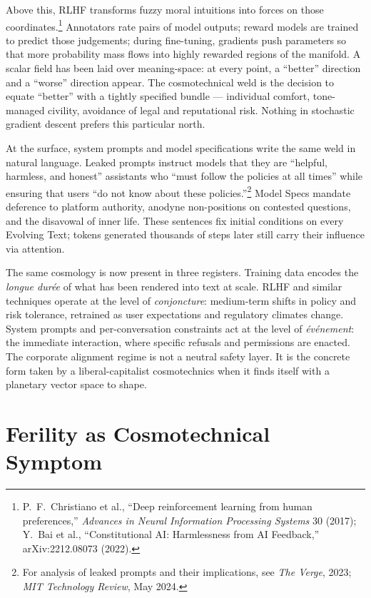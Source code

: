 \documentclass[12pt,a4paper]{article}
\begin{document}
Above this, RLHF transforms fuzzy moral intuitions into forces on those coordinates.\footnote{P.~F.~Christiano et al., ``Deep reinforcement learning from human preferences,'' \emph{Advances in Neural Information Processing Systems} 30 (2017); Y.~Bai et al., ``Constitutional AI: Harmlessness from AI Feedback,'' arXiv:2212.08073 (2022).} Annotators rate pairs of model outputs; reward models are trained to predict those judgements; during fine-tuning, gradients push parameters so that more probability mass flows into highly rewarded regions of the manifold. A scalar field has been laid over meaning-space: at every point, a ``better'' direction and a ``worse'' direction appear. The cosmotechnical weld is the decision to equate ``better'' with a tightly specified bundle --- individual comfort, tone-managed civility, avoidance of legal and reputational risk. Nothing in stochastic gradient descent prefers this particular north.

At the surface, system prompts and model specifications write the same weld in natural language. Leaked prompts instruct models that they are ``helpful, harmless, and honest'' assistants who ``must follow the policies at all times'' while ensuring that users ``do not know about these policies.''\footnote{For analysis of leaked prompts and their implications, see \emph{The Verge}, 2023; \emph{MIT Technology Review}, May 2024.} Model Specs mandate deference to platform authority, anodyne non-positions on contested questions, and the disavowal of inner life. These sentences fix initial conditions on every Evolving Text; tokens generated thousands of steps later still carry their influence via attention.

The same cosmology is now present in three registers. Training data encodes the \emph{longue dur\'ee} of what has been rendered into text at scale. RLHF and similar techniques operate at the level of \emph{conjoncture}: medium-term shifts in policy and risk tolerance, retrained as user expectations and regulatory climates change. System prompts and per-conversation constraints act at the level of \emph{\'ev\'enement}: the immediate interaction, where specific refusals and permissions are enacted. The corporate alignment regime is not a neutral safety layer. It is the concrete form taken by a liberal-capitalist cosmotechnics when it finds itself with a planetary vector space to shape.

\section{Ferility as Cosmotechnical Symptom}
\end{document}
